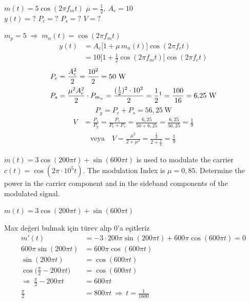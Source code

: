 \documentclass[11pt,a4paper]{article}
\begin{document}
\begin{ornek}
$m(t)=5\cos(2\pi f_m t)$ \qquad $\mu=\tfrac{1}{2},\ A_c=10$\\
$y(t)=?$ \quad $P_c=?$ \quad $P_s=?$ \quad $V=?$
\end{ornek}

$m_p = 5 \;\Rightarrow\; m_n(t) = \cos(2\pi f_m t)$
\begin{align*}
y(t) &= A_c\bigl[1+\mu\,m_n(t)\bigr]\cos(2\pi f_c t)\\
&= 10\bigl[1+\tfrac{1}{2}\cos(2\pi f_m t)\bigr]\cos(2\pi f_c t)
\end{align*}
\begin{align*}
P_c &= \frac{A_c^2}{2} = \frac{10^2}{2} = 50\ \mathrm{W}\\
P_s &= \frac{\mu^2A_c^2}{2}\cdot P_{m_n} = \frac{(\frac{1}{2})^2\cdot 10^2}{2} = \frac{1}{2}\footnotemark = \frac{100}{16} = 6{,}25\ \mathrm{W}
\end{align*}
\[ P_y = P_c+P_s = 56{,}25\ \mathrm{W} \]
\begin{align*}
V &= \frac{P_s}{P_y} = \frac{P_s}{P_c+P_s} = \frac{6{,}25}{50+6{,}25} = \frac{6{,}25}{56{,}25} = \frac{1}{9}\\
&\quad\text{veya}\quad V = \frac{\mu^2}{2+\mu^2} = \frac{\frac{1}{4}}{2+\frac{1}{4}} = \frac{1}{9}
\end{align*}

\begin{ornek}[(Proakis)]
$m(t)=3\cos(200\pi t)+\sin(600\pi t)$ is used to modulate the carrier $c(t)=\cos(2\pi\cdot 10^5 t)$. The modulation Index is $\mu=0{,}85$. Determine the power in the carrier component and in the sideband components of the modulated signal.
\end{ornek}

$m(t) = 3\cos(200\pi t)+\sin(600\pi t)$

\textcolor{kirmizikalem}{Max değeri bulmak için türev alıp 0'a eşitleriz}
\begin{align*}
m'(t) &= -3\cdot 200\pi\sin(200\pi t) + 600\pi\cos(600\pi t) = 0\\
600\pi\sin(200\pi t) &= 600\pi\cos(600\pi t)\\
\sin(200\pi t) &= \cos(600\pi t)\\
\cos\bigl(\tfrac{\pi}{2}-200\pi t\bigr) &= \cos(600\pi t)\\
\Rightarrow\ \tfrac{\pi}{2}-200\pi t &= 600\pi t\\
\tfrac{\pi}{2} &= 800\pi t \ \Rightarrow\ t=\tfrac{1}{1600}
\end{align*}
\end{document}
